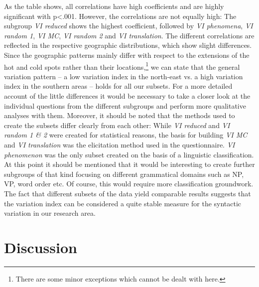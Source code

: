 \documentclass[output=paper]{LSP/langsci}
\begin{document}
As the table shows, all correlations have high coefficients and are highly significant with p{\textless}.001. However, the correlations are not equally high: The subgroup \emph{VI reduced} shows the highest coefficient, followed by \emph{VI phenomena}, \emph{VI random 1}, \emph{VI MC}, \emph{VI random 2} and \emph{VI translation}. The different correlations are reflected in the respective geographic distributions, which show slight differences. Since the geographic patterns mainly differ with respect to the extensions of the hot and cold spots rather than their locations,\footnote{There are some minor exceptions which cannot be dealt with here.} we can state that the general variation pattern – a low variation index in the north-east vs. a high variation index in the southern areas – holds for all our subsets. For a more detailed account of the little differences it would be necessary to take a closer look at the individual questions from the different subgroups and perform more qualitative analyses with them. Moreover, it should be noted that the methods used to create the subsets differ clearly from each other: While \emph{VI reduced} and \emph{VI random 1 \& 2} were created for statistical reasons, the basis for building \emph{VI MC} and \emph{VI translation} was the elicitation method used in the questionnaire. \emph{VI phenomenon }was the only subset created on the basis of a linguistic classification. At this point it should be mentioned that it would be interesting to create further subgroups of that kind focusing on different grammatical domains such as NP, VP, word order etc. Of course, this would require more classification groundwork. The fact that different subsets of the data yield comparable results suggests that the variation index can be considered a quite stable measure for the syntactic variation in our research area.

\section{Discussion}
\end{document}
